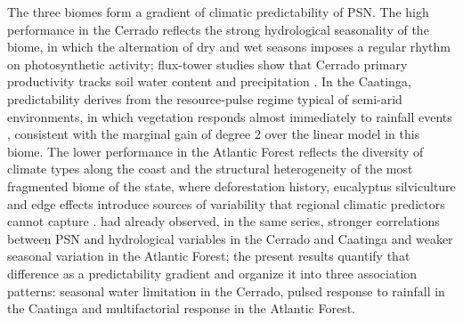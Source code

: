 \documentclass[a4paper,fleqn]{cas-sc}
\begin{document}
The three biomes form a gradient of climatic predictability of PSN. The high performance in the Cerrado reflects the strong hydrological seasonality of the biome, in which the alternation of dry and wet seasons imposes a regular rhythm on photosynthetic activity; flux-tower studies show that Cerrado primary productivity tracks soil water content and precipitation \citep{arruda2016,biudes2021,vourlitis2022}. In the Caatinga, predictability derives from the resource-pulse regime typical of semi-arid environments, in which vegetation responds almost immediately to rainfall events \citep{schwinning2004,mendes2025,silva2026}, consistent with the marginal gain of degree 2 over the linear model in this biome. The lower performance in the Atlantic Forest reflects the diversity of climate types along the coast \citep{alvares2013} and the structural heterogeneity of the most fragmented biome of the state, where deforestation history, eucalyptus silviculture and edge effects introduce sources of variability that regional climatic predictors cannot capture \citep{lima2020,broggio2024}. \citet{benfica2023} had already observed, in the same series, stronger correlations between PSN and hydrological variables in the Cerrado and Caatinga and weaker seasonal variation in the Atlantic Forest; the present results quantify that difference as a predictability gradient and organize it into three association patterns: seasonal water limitation in the Cerrado, pulsed response to rainfall in the Caatinga and multifactorial response in the Atlantic Forest.
\end{document}
